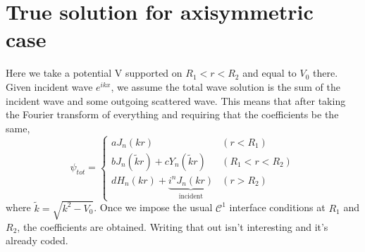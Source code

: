 \section{True solution for axisymmetric case}

Here we take a potential V supported on $R_1 < r < R_2$ and equal to
$V_0$ there.
Given incident wave $e^{ikx}$, we assume the total wave solution is the
sum of the incident wave and some outgoing scattered wave. This means
that after taking the Fourier transform of everything and requiring
that the coefficients be the same,
\[
 \psi_{tot} = \begin{cases}
               aJ_n(kr) & (r < R_1) \\
               bJ_n(\tilde{k}r) + cY_n(\tilde{k}r) & (R_1 < r < R_2) \\
               dH_n(kr) + \underbrace{i^nJ_n(kr)}_{\text{incident}} & ( r > R_2)
              \end{cases}
\]
where $\tilde{k} = \sqrt{k^2-V_0}$.
Once we impose the usual $\mathcal{C}^1$ interface conditions at
$R_1$ and $R_2$, the coefficients are obtained. Writing that out isn't
interesting and it's already coded.
